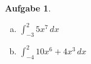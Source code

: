 \documentclass[12pt]{article}
\theoremstyle{note}
\newtheorem{aufgabe}{Aufgabe}
\begin{document}
 
\begin{flushleft}
\begin{aufgabe} ~ \\ 
\begin{multicols}{2} 
\begin{enumerate}[a)] 
\item 
$\int_{-3}^{2} 5 x^{7}\, dx$
\item 
$\int_{-4}^{2} 10 x^{6} + 4 x^{3}\, dx$
\end{enumerate} 
\end{multicols} 
\end{aufgabe} 
\end{flushleft} 
\end{document}
